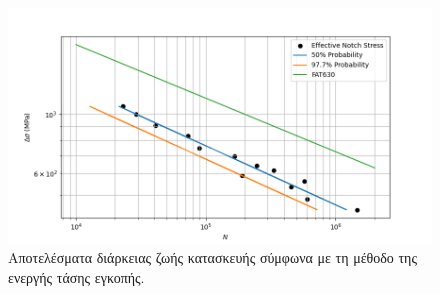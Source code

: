 \documentclass{article}
\begin{document}
\begin{figure}[H]
    \centering
    \includegraphics[width = 0.8\linewidth]{media/ens.png}
    \caption{Αποτελέσματα διάρκειας ζωής κατασκευής σύμφωνα με τη μέθοδο της ενεργής τάσης εγκοπής.}
    \label{fig:ensr}
\end{figure}




\listoffigures
\listoftables



\printbibliography
\end{document}
